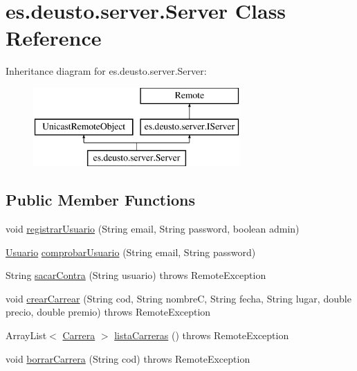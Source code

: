 \hypertarget{classes_1_1deusto_1_1server_1_1_server}{}\section{es.\+deusto.\+server.\+Server Class Reference}
\label{classes_1_1deusto_1_1server_1_1_server}
Inheritance diagram for es.\+deusto.\+server.\+Server\+:\begin{figure}[H]
\begin{center}
\leavevmode
\includegraphics[height=3.000000cm]{classes_1_1deusto_1_1server_1_1_server}
\end{center}
\end{figure}
\subsection*{Public Member Functions}
\begin{DoxyCompactItemize}
\item 
void \mbox{\hyperlink{classes_1_1deusto_1_1server_1_1_server_a0f79b8db6904facdae94410e26bef452}{registrar\+Usuario}} (String email, String password, boolean admin)
\item 
\mbox{\hyperlink{classes_1_1deusto_1_1server_1_1jdo_1_1_usuario}{Usuario}} \mbox{\hyperlink{classes_1_1deusto_1_1server_1_1_server_afa3e758715cbf321f9c1cbe08a8583a4}{comprobar\+Usuario}} (String email, String password)
\item 
String \mbox{\hyperlink{classes_1_1deusto_1_1server_1_1_server_aefe051d880626950ea2964d89a4ae3c3}{sacar\+Contra}} (String usuario)  throws Remote\+Exception 
\item 
void \mbox{\hyperlink{classes_1_1deusto_1_1server_1_1_server_a22d31cd9642f978f1995fc7822d99258}{crear\+Carrear}} (String cod, String nombreC, String fecha, String lugar, double precio, double premio)  throws Remote\+Exception
\item 
Array\+List$<$ \mbox{\hyperlink{classes_1_1deusto_1_1server_1_1jdo_1_1_carrera}{Carrera}} $>$ \mbox{\hyperlink{classes_1_1deusto_1_1server_1_1_server_af62ce3462ec30a081db0009d2f2b33bb}{lista\+Carreras}} ()  throws Remote\+Exception
\item 
void \mbox{\hyperlink{classes_1_1deusto_1_1server_1_1_server_a0a3160bdb7bfaab43143f1b0e68aee51}{borrar\+Carrera}} (String cod)  throws Remote\+Exception
\end{DoxyCompactItemize}
